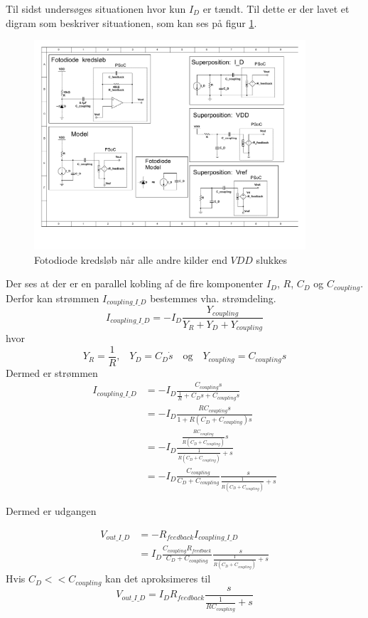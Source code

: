 \documentclass[HardwareDesign/HardwareDesign_main.tex]{subfiles}
\begin{document}
Til sidst undersøges situationen hvor kun $I_D$ er tændt. Til dette er der lavet et digram som beskriver situationen, som kan ses på figur \ref{fig:photodiodeSPI_D}. 

\begin{figure}[H]
    \centering
    \includegraphics[width=0.9\textwidth,trim={6.3in 5.8in 0.8in 0.6in},clip, page=1]{HardwareDesign/CupSensor/graphics/Superposition.pdf}
    \caption{Fotodiode kredsløb når alle andre kilder end $VDD$ slukkes}
    \label{fig:photodiodeSPI_D}
\end{figure}

Der ses at der er en parallel kobling af de fire komponenter $I_D$, $R$, $C_D$ og $C_{coupling}$. Derfor kan strømmen $I_{coupling\_I\_D}$ bestemmes vha. strømdeling. 
$$
I_{coupling\_I\_D} = - I_D \frac{Y_{coupling}}{Y_R + Y_D + Y_{coupling}}
$$
hvor
$$
Y_R = \frac{1}{R} \textrm{,} \quad Y_D = C_D \dot s \quad \textrm{og} \quad Y_{coupling} = C_{coupling} s
$$
Dermed er strømmen
\begin{align}
I_{coupling\_I\_D} &= -I_D \frac{C_{coupling} s}{\frac{1}{R} + C_D s + C_{coupling} s}\\
&= - I_D \frac{R C_{coupling} s}{1 + R\left(C_D + C_{coupling} \right)s}\\
&=  - I_D \frac{\frac{R C_{coupling}}{R\left(C_D + C_{coupling} \right)} s}{\frac{1}{R\left(C_D + C_{coupling} \right)} + s}\\
&= - I_D \frac{C_{coupling}}{C_D + C_{coupling}} \frac{s}{\frac{1}{R\left(C_D + C_{coupling} \right)} + s}
\end{align}

Dermed er udgangen

\begin{align}
V_{out\_I\_D} &= -R_{feedback}I_{coupling\_I\_D}\\
&= I_D \frac{C_{coupling}R_{feedback}}{C_D + C_{coupling}} \frac{s}{\frac{1}{R\left(C_D + C_{coupling} \right)} + s}
\end{align}
Hvis $C_D << C_{coupling}$ kan det aproksimeres til
$$V_{out\_I\_D} = I_D R_{feedback} \frac{s}{\frac{1}{R C_{coupling}} + s}$$
\end{document}
